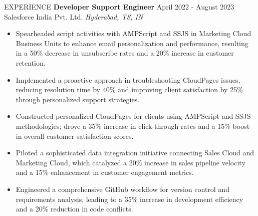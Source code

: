 \documentclass[11pt]{resume}
\begin{document}
\begin{rSection}{EXPERIENCE}
        \textbf{Developer Support Engineer} \hfill April 2022 - August 2023\\
        Salesforce India Pvt. Ltd. \hfill \textit{Hyderabad, TS, IN}
        \begin{itemize}
            \itemsep -3pt {}
            \item Spearheaded script activities with AMPScript and SSJS in Marketing Cloud Business Units to enhance email personalization and performance, resulting in a 50\% decrease in unsubscribe rates and a 20\% increase in customer retention.
            \item Implemented a proactive approach in troubleshooting CloudPages issues, reducing resolution time by 40\% and improving client satisfaction by 25\% through personalized support strategies.
            \item Constructed personalized CloudPages for clients using AMPScript and SSJS methodologies; drove a 35\% increase in click-through rates and a 15\% boost in overall customer satisfaction scores.
            \item Piloted a sophisticated data integration initiative connecting Sales Cloud and Marketing Cloud, which catalyzed a 20\% increase in sales pipeline velocity and a 15\% enhancement in customer engagement metrics.
            \item Engineered a comprehensive GitHub workflow for version control and requirements analysis, leading to a 35\% increase in development efficiency and a 20\% reduction in code conflicts.
        \end{itemize} \hfill \newline


\end{rSection}
\end{document}
